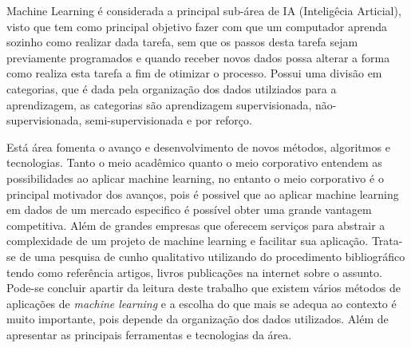 Machine Learning é considerada a principal sub-área de IA (Inteligêcia Articial), visto que tem como principal objetivo fazer com 
que um computador aprenda sozinho como realizar dada tarefa, sem que os passos desta tarefa sejam previamente programados e
quando receber novos dados possa alterar a forma como realiza esta tarefa a fim de otimizar o processo. Possui uma divisão
em categorias, que é dada pela organização dos dados utilziados para a aprendizagem, as categorias são aprendizagem supervisionada, não-supervisionada, 
semi-supervisionada e por reforço.   


Está área fomenta o avanço e desenvolvimento de novos métodos, algoritmos e tecnologias. Tanto o meio acadêmico quanto o meio 
corporativo entendem as possibilidades ao aplicar machine learning, no entanto o meio corporativo é o principal motivador 
dos avanços, pois é possivel que ao aplicar machine learning em dados de um mercado especifico é possível obter uma grande
vantagem competitiva. Além de grandes empresas que oferecem serviços para abstrair a complexidade de um projeto de 
machine learning e facilitar sua aplicação. Trata-se de uma pesquisa de cunho qualitativo utilizando do procedimento
bibliográfico tendo como referência artigos, livros publicações na internet sobre o assunto. Pode-se concluir apartir da 
leitura deste trabalho que existem vários métodos de aplicações de \textit{machine learning} e a escolha do que mais 
se adequa ao contexto é muito importante, pois depende da organização dos dados utilizados. 
Além de apresentar as principais ferramentas e tecnologias da área.   




